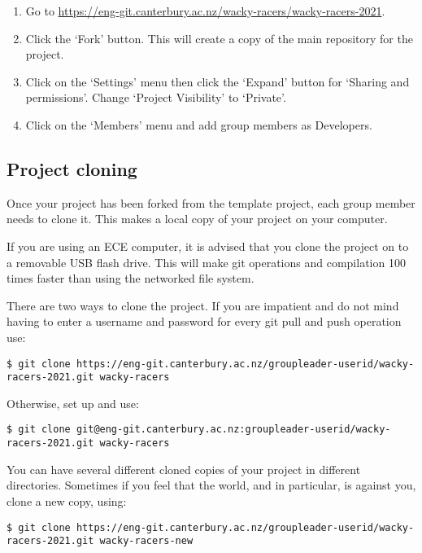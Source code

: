 \begin{enumerate}
\item
  Go to
  \href{https://eng-git.canterbury.ac.nz/wacky-racers/wacky-racers-2021}{\url{https://eng-git.canterbury.ac.nz/wacky-racers/wacky-racers-2021}}.
\item
  Click the `Fork' button. This will create a copy of the main repository
  for the project.
\item
  Click on the `Settings' menu then click the `Expand' button for
  `Sharing and permissions'. Change `Project Visibility' to `Private'.
\item
  Click on the `Members' menu and add group members as Developers.
\end{enumerate}


\subsection{Project cloning}
\label{project-cloning}

Once your project has been forked from the template project, each group
member needs to clone it. This makes a local copy of your project on
your computer. 

If you are using an ECE computer, it is advised that you clone the
project on to a removable USB flash drive. This will make git
operations and compilation 100 times faster than using the networked
file system.

There are two ways to clone the project. If you are impatient and do not
mind having to enter a username and password for every git pull and push
operation use:
%
\begin{verbatim}
$ git clone https://eng-git.canterbury.ac.nz/groupleader-userid/wacky-racers-2021.git wacky-racers
\end{verbatim}

Otherwise, set up  and use:
%
\begin{verbatim}
$ git clone git@eng-git.canterbury.ac.nz:groupleader-userid/wacky-racers-2021.git wacky-racers
\end{verbatim}

You can have several different cloned copies of your project in
different directories. Sometimes if you feel that the world,
and  in particular, is against you, clone a new copy,
using:
%
\begin{verbatim}
$ git clone https://eng-git.canterbury.ac.nz/groupleader-userid/wacky-racers-2021.git wacky-racers-new
\end{verbatim}


